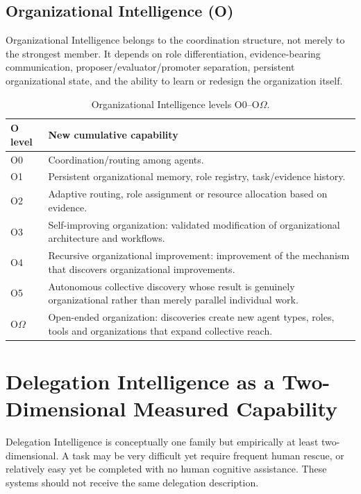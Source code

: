 \documentclass[11pt]{article}
\theoremstyle{definition}
\newcommand{\Om}{\ensuremath{\Omega}}
\begin{document}
\subsection{Organizational Intelligence (O)}

Organizational Intelligence belongs to the coordination structure, not merely to the strongest member. It depends on role differentiation, evidence-bearing communication, proposer/evaluator/promoter separation, persistent organizational state, and the ability to learn or redesign the organization itself.

\begin{table}[!htbp]
\centering\small
\begin{tabularx}{\textwidth}{@{}lY@{}}
\toprule
O level & New cumulative capability \\
\midrule
O0 & Coordination/routing among agents. \\
O1 & Persistent organizational memory, role registry, task/evidence history. \\
O2 & Adaptive routing, role assignment or resource allocation based on evidence. \\
O3 & Self-improving organization: validated modification of organizational architecture and workflows. \\
O4 & Recursive organizational improvement: improvement of the mechanism that discovers organizational improvements. \\
O5 & Autonomous collective discovery whose result is genuinely organizational rather than merely parallel individual work. \\
O\Om{} & Open-ended organization: discoveries create new agent types, roles, tools and organizations that expand collective reach. \\
\bottomrule
\end{tabularx}
\caption{Organizational Intelligence levels O0--O\Om{}.}
\label{tab:o}
\end{table}

\section{Delegation Intelligence as a Two-Dimensional Measured Capability}

Delegation Intelligence is conceptually one family but empirically at least two-dimensional. A task may be very difficult yet require frequent human rescue, or relatively easy yet be completed with no human cognitive assistance. These systems should not receive the same delegation description.
\end{document}
